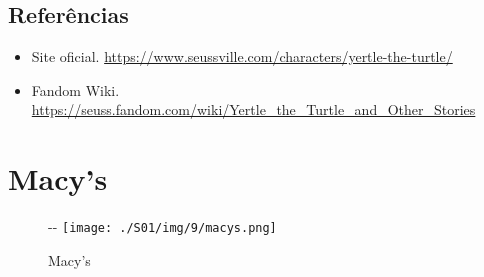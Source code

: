 \hypertarget{referuxeancias}{%
\subsection{Referências}\label{referuxeancias}}

\begin{itemize}
\tightlist
\item
  \sloppy Site oficial. \url{https://www.seussville.com/characters/yertle-the-turtle/}
\item
  \sloppy Fandom Wiki. \url{https://seuss.fandom.com/wiki/Yertle_the_Turtle_and_Other_Stories}
\end{itemize}

\hypertarget{macys}{%
\section{Macy's}\label{macys}}

\begin{figure}[!ht]
  \begin{adjustwidth}{-\oddsidemargin-1in}{-\rightmargin}
    \centering
    \texttt{[image: ./S01/img/9/macys.png]}
    \caption{Macy’s\label{fig:macy-s}}
  \end{adjustwidth}
\end{figure}

